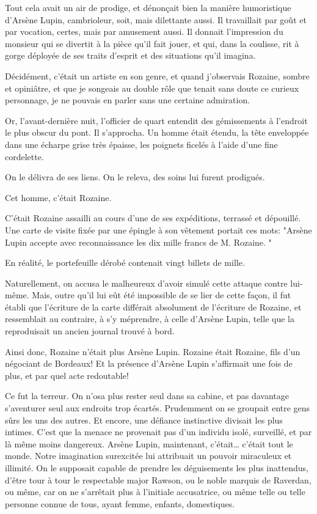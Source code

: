 \documentclass[12pt,a4paper]{book}
\begin{document}
Tout cela avait un air de prodige, et dénonçait bien la manière humoristique d’Arsène Lupin, cambrioleur, soit, mais dilettante aussi. Il travaillait par goût et par vocation, certes, mais par amusement aussi. Il donnait l’impression du monsieur qui se divertit à la pièce qu’il fait jouer, et qui, dans la coulisse, rit à gorge déployée de ses traits d’esprit et des situations qu’il imagina.

Décidément, c’était un artiste en son genre, et quand j’observais Rozaine, sombre et opiniâtre, et que je songeais au double rôle que tenait sans doute ce curieux personnage, je ne pouvais en parler sans une certaine admiration.

Or, l’avant-dernière nuit, l’officier de quart entendit des gémissements à l’endroit le plus obscur du pont. Il s’approcha. Un homme était étendu, la tête enveloppée dans une écharpe grise très épaisse, les poignets ficelés à l’aide d’une fine cordelette.

On le délivra de ses liens. On le releva, des soins lui furent prodigués.

Cet homme, c’était Rozaine.

C’était Rozaine assailli au cours d’une de ses expéditions, terrassé et dépouillé. Une carte de visite fixée par une épingle à son vêtement portait ces mots: "Arsène Lupin accepte avec reconnaissance les dix mille francs de M. Rozaine. "

En réalité, le portefeuille dérobé contenait vingt billets de mille.

Naturellement, on accusa le malheureux d’avoir simulé cette attaque contre lui-même. Mais, outre qu’il lui eût été impossible de se lier de cette façon, il fut établi que l’écriture de la carte différait absolument de l’écriture de Rozaine, et ressemblait au contraire, à s’y méprendre, à celle d’Arsène Lupin, telle que la reproduisait un ancien journal trouvé à bord.

Ainsi donc, Rozaine n’était plus Arsène Lupin. Rozaine était Rozaine, fils d’un négociant de Bordeaux! Et la présence d’Arsène Lupin s’affirmait une fois de plus, et par quel acte redoutable!

Ce fut la terreur. On n’osa plus rester seul dans sa cabine, et pas davantage s’aventurer seul aux endroits trop écartés. Prudemment on se groupait entre gens sûrs les uns des autres. Et encore, une défiance instinctive divisait les plus intimes. C’est que la menace ne provenait pas d’un individu isolé, surveillé, et par là même moins dangereux. Arsène Lupin, maintenant, c’était… c’était tout le monde. Notre imagination surexcitée lui attribuait un pouvoir miraculeux et illimité. On le supposait capable de prendre les déguisements les plus inattendus, d’être tour à tour le respectable major Rawson, ou le noble marquis de Raverdan, ou même, car on ne s’arrêtait plus à l’initiale accusatrice, ou même telle ou telle personne connue de tous, ayant femme, enfants, domestiques.
\end{document}
